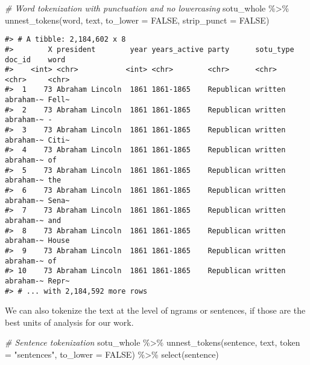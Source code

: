 \documentclass[
]{book}
\newenvironment{Shaded}{\begin{snugshade}}{\end{snugshade}}
\newcommand{\AttributeTok}[1]{\textcolor[rgb]{0.77,0.63,0.00}{#1}}
\newcommand{\CommentTok}[1]{\textcolor[rgb]{0.56,0.35,0.01}{\textit{#1}}}
\newcommand{\ConstantTok}[1]{\textcolor[rgb]{0.00,0.00,0.00}{#1}}
\newcommand{\FunctionTok}[1]{\textcolor[rgb]{0.00,0.00,0.00}{#1}}
\newcommand{\NormalTok}[1]{#1}
\newcommand{\SpecialCharTok}[1]{\textcolor[rgb]{0.00,0.00,0.00}{#1}}
\newcommand{\StringTok}[1]{\textcolor[rgb]{0.31,0.60,0.02}{#1}}
\begin{document}
\begin{Shaded}
\begin{Highlighting}[]
\CommentTok{\# Word tokenization with punctuation and no lowercasing}
\NormalTok{sotu\_whole }\SpecialCharTok{\%\textgreater{}\%}
  \FunctionTok{unnest\_tokens}\NormalTok{(word, text, }\AttributeTok{to\_lower =} \ConstantTok{FALSE}\NormalTok{, }\AttributeTok{strip\_punct =} \ConstantTok{FALSE}\NormalTok{)}
\end{Highlighting}
\end{Shaded}

\begin{verbatim}
#> # A tibble: 2,184,602 x 8
#>        X president        year years_active party      sotu_type doc_id    word 
#>    <int> <chr>           <int> <chr>        <chr>      <chr>     <chr>     <chr>
#>  1    73 Abraham Lincoln  1861 1861-1865    Republican written   abraham-~ Fell~
#>  2    73 Abraham Lincoln  1861 1861-1865    Republican written   abraham-~ -    
#>  3    73 Abraham Lincoln  1861 1861-1865    Republican written   abraham-~ Citi~
#>  4    73 Abraham Lincoln  1861 1861-1865    Republican written   abraham-~ of   
#>  5    73 Abraham Lincoln  1861 1861-1865    Republican written   abraham-~ the  
#>  6    73 Abraham Lincoln  1861 1861-1865    Republican written   abraham-~ Sena~
#>  7    73 Abraham Lincoln  1861 1861-1865    Republican written   abraham-~ and  
#>  8    73 Abraham Lincoln  1861 1861-1865    Republican written   abraham-~ House
#>  9    73 Abraham Lincoln  1861 1861-1865    Republican written   abraham-~ of   
#> 10    73 Abraham Lincoln  1861 1861-1865    Republican written   abraham-~ Repr~
#> # ... with 2,184,592 more rows
\end{verbatim}

We can also tokenize the text at the level of ngrams or sentences, if those are the best units of analysis for our work.

\begin{Shaded}
\begin{Highlighting}[]
\CommentTok{\# Sentence tokenization}
\NormalTok{sotu\_whole }\SpecialCharTok{\%\textgreater{}\%}
  \FunctionTok{unnest\_tokens}\NormalTok{(sentence, text, }\AttributeTok{token =} \StringTok{"sentences"}\NormalTok{, }\AttributeTok{to\_lower =} \ConstantTok{FALSE}\NormalTok{) }\SpecialCharTok{\%\textgreater{}\%} 
  \FunctionTok{select}\NormalTok{(sentence)}
\end{Highlighting}
\end{Shaded}
\end{document}
